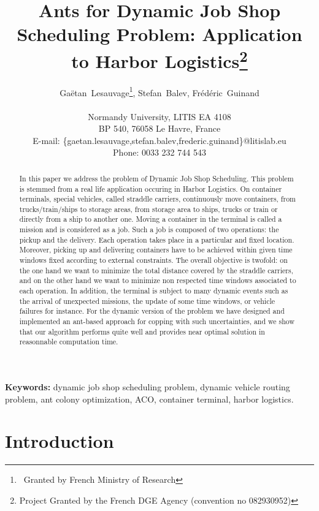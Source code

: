 \documentclass[a4paper,10pt]{article}
\title{Ants for Dynamic Job Shop Scheduling Problem: Application to Harbor Logistics\thanks{Project Granted by the French DGE Agency (convention no 082930952)}}
\author{Ga\"{e}tan~Lesauvage\thanks{~Granted by French Ministry of Research}, Stefan~Balev, Fr\'{e}d\'{e}ric~Guinand\\\\
\medskip
Normandy University, LITIS EA 4108\\
BP 540, 76058 Le Havre, France\\
\medskip
E-mail: \{gaetan.lesauvage,stefan.balev,frederic.guinand\}@litislab.eu\\
\medskip
Phone: 0033 232 744 543
}
\begin{document}
\maketitle


\begin{abstract}
In this paper we address the problem of Dynamic Job Shop Scheduling. This problem is stemmed from a real life application occuring in Harbor Logistics. On container terminals, special vehicles, called straddle carriers, continuously move containers, from trucks/train/ships to storage areas, from storage area to ships, trucks or train or directly from a ship to another one. Moving a container in the terminal is called a mission and is considered as a job. Such a job is composed of two operations: the pickup and the delivery. Each operation takes place in a particular and fixed location. Moreover, picking up and delivering containers have to be achieved within given time windows fixed according to external constraints. The overall objective is twofold: on the one hand we want to minimize the total distance covered by the straddle carriers, and on the other hand we want to minimize non respected time windows associated to each operation. 
In addition, the terminal is subject to many dynamic events such as the arrival of unexpected missions, the update of some time windows, or vehicle failures for instance. For the dynamic version of the problem we have designed and implemented an ant-based approach for copping with such uncertainties, and we show that our algorithm performs quite well and provides near optimal solution in reasonnable computation time.
\end{abstract}

{\bf Keywords: } dynamic job shop scheduling problem, dynamic vehicle routing problem, ant colony optimization, ACO, container terminal, harbor logistics.\\

\section{Introduction}
\end{document}
